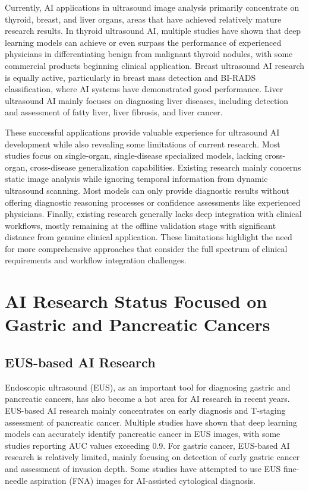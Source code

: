 Currently, AI applications in ultrasound image analysis primarily concentrate on thyroid, breast, and liver organs, areas that have achieved relatively mature research results. In thyroid ultrasound AI, multiple studies have shown that deep learning models can achieve or even surpass the performance of experienced physicians in differentiating benign from malignant thyroid nodules, with some commercial products beginning clinical application. Breast ultrasound AI research is equally active, particularly in breast mass detection and BI-RADS classification, where AI systems have demonstrated good performance. Liver ultrasound AI mainly focuses on diagnosing liver diseases, including detection and assessment of fatty liver, liver fibrosis, and liver cancer.

These successful applications provide valuable experience for ultrasound AI development while also revealing some limitations of current research. Most studies focus on single-organ, single-disease specialized models, lacking cross-organ, cross-disease generalization capabilities. Existing research mainly concerns static image analysis while ignoring temporal information from dynamic ultrasound scanning. Most models can only provide diagnostic results without offering diagnostic reasoning processes or confidence assessments like experienced physicians. Finally, existing research generally lacks deep integration with clinical workflows, mostly remaining at the offline validation stage with significant distance from genuine clinical application. These limitations highlight the need for more comprehensive approaches that consider the full spectrum of clinical requirements and workflow integration challenges.

\section{AI Research Status Focused on Gastric and Pancreatic Cancers}

\subsection{EUS-based AI Research}

Endoscopic ultrasound (EUS), as an important tool for diagnosing gastric and pancreatic cancers, has also become a hot area for AI research in recent years. EUS-based AI research mainly concentrates on early diagnosis and T-staging assessment of pancreatic cancer. Multiple studies have shown that deep learning models can accurately identify pancreatic cancer in EUS images, with some studies reporting AUC values exceeding 0.9. For gastric cancer, EUS-based AI research is relatively limited, mainly focusing on detection of early gastric cancer and assessment of invasion depth. Some studies have attempted to use EUS fine-needle aspiration (FNA) images for AI-assisted cytological diagnosis.

